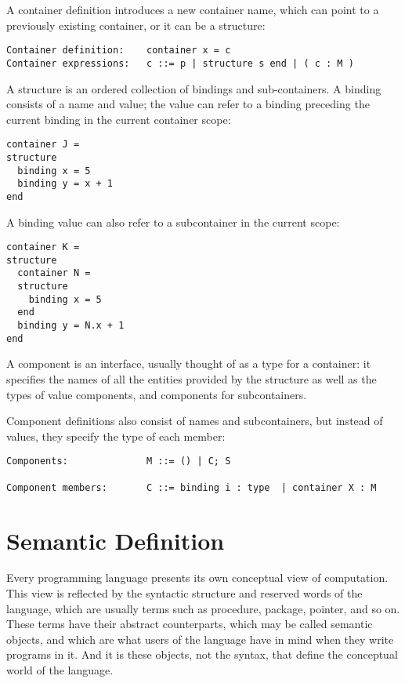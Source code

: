 \documentclass[10pt]{article}
\begin{document}
A container definition introduces a new container name, which can
point to a previously existing container, or it can be a structure: \begin{center}
{\small{}\begin{verbatim}
Container definition:    container x = c
Container expressions:   c ::= p | structure s end | ( c : M )
\end{verbatim}
}\end{center}


A structure is an ordered collection of bindings and
sub-containers. A binding consists of a name and value; the value can
refer to a binding preceding the current binding in the current
container scope: \begin{center}
{\small{}\begin{verbatim}
container J =
structure
  binding x = 5
  binding y = x + 1
end
\end{verbatim}
}\end{center}


A binding value can also refer to a subcontainer in the current scope: \begin{center}
{\small{}\begin{verbatim}
container K =
structure
  container N =
  structure
    binding x = 5
  end
  binding y = N.x + 1
end
\end{verbatim}
}\end{center}


A component is an interface, usually thought of as a type for a
container: it specifies the names of all the entities provided by the
structure as well as the types of value components, and components for
subcontainers. 

Component definitions also consist of names and subcontainers, but
instead of values, they specify the type of each member: \begin{center}
{\small{}\begin{verbatim}
Components:              M ::= () | C; S

Component members:       C ::= binding i : type  | container X : M
\end{verbatim}
}\end{center}


\section*{Semantic Definition}
Every programming language presents its own conceptual view of
computation. This view is reflected by the syntactic structure and
reserved words of the language, which are usually terms such as
procedure, package, pointer, and so on. These terms have their
abstract counterparts, which may be called semantic objects, and which
are what users of the language have in mind when they write programs
in it. And it is these objects, not the syntax, that define the
conceptual world of the language. 
\end{document}
